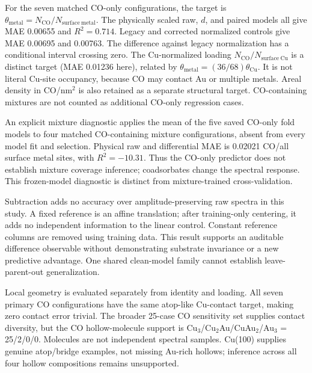 \documentclass[11pt,a4paper]{article}
\begin{document}
For the seven matched CO-only configurations, the target is $\theta_{\mathrm{metal}}=N_{\mathrm{CO}}/N_{\mathrm{surface\ metal}}$. The physically scaled raw, $d$, and paired models all give MAE 0.00655 and $R^2=0.714$. Legacy and corrected normalized controls give MAE 0.00695 and 0.00763. The difference against legacy normalization has a conditional interval crossing zero. The Cu-normalized loading $N_{\mathrm{CO}}/N_{\mathrm{surface\ Cu}}$ is a distinct target (MAE 0.01236 here), related by $\theta_{\mathrm{metal}}=(36/68)\theta_{\mathrm{Cu}}$. It is not literal Cu-site occupancy, because CO may contact Au or multiple metals. Areal density in CO/nm$^2$ is also retained as a separate structural target. CO-containing mixtures are not counted as additional CO-only regression cases.

An explicit mixture diagnostic applies the mean of the five saved CO-only fold models to four matched CO-containing mixture configurations, absent from every model fit and selection. Physical raw and differential MAE is 0.02021 CO/all surface metal sites, with $R^2=-10.31$. Thus the CO-only predictor does not establish mixture coverage inference; coadsorbates change the spectral response. This frozen-model diagnostic is distinct from mixture-trained cross-validation.

Subtraction adds no accuracy over amplitude-preserving raw spectra in this study. A fixed reference is an affine translation; after training-only centering, it adds no independent information to the linear control. Constant reference columns are removed using training data. This result supports an auditable difference observable without demonstrating substrate invariance or a new predictive advantage. One shared clean-model family cannot establish leave-parent-out generalization.

Local geometry is evaluated separately from identity and loading. All seven primary CO configurations have the same atop-like Cu-contact target, making zero contact error trivial. The broader 25-case CO sensitivity set supplies contact diversity, but the CO hollow-molecule support is Cu$_3$/Cu$_2$Au/CuAu$_2$/Au$_3$ = 25/2/0/0. Molecules are not independent spectral samples. Cu(100) supplies genuine atop/bridge examples, not missing Au-rich hollows; inference across all four hollow compositions remains unsupported.
\end{document}
